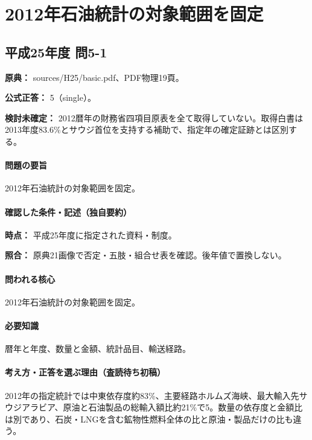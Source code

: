 \section{2012年石油統計の対象範囲を固定}

\subsection{平成25年度 問5-1}
\label{q:h25-reg-basic-5-1}

\noindent\textbf{原典：} sources/H25/basic.pdf、PDF物理19頁。

\textbf{公式正答：} 5（single）。

\par\textbf{検討未確定：} 2012暦年の財務省四項目原表を全て取得していない。取得白書は2013年度83.6\%とサウジ首位を支持する補助で、指定年の確定証跡とは区別する。

\paragraph{問題の要旨} 2012年石油統計の対象範囲を固定。

\paragraph{確認した条件・記述（独自要約）}\mbox{}\par

\noindent\textbf{時点：} 平成25年度に指定された資料・制度。\par

\noindent\textbf{照合：} 原典21画像で否定・五肢・組合せ表を確認。後年値で置換しない。\par

\paragraph{問われる核心} 2012年石油統計の対象範囲を固定。

\paragraph{必要知識} 暦年と年度、数量と金額、統計品目、輸送経路。

\paragraph{考え方・正答を選ぶ理由（査読待ち初稿）} 2012年の指定統計では中東依存度約83\%、主要経路ホルムズ海峡、最大輸入先サウジアラビア、原油と石油製品の総輸入額比約21\%で5。数量の依存度と金額比は別であり、石炭・LNGを含む鉱物性燃料全体の比と原油・製品だけの比も違う。

